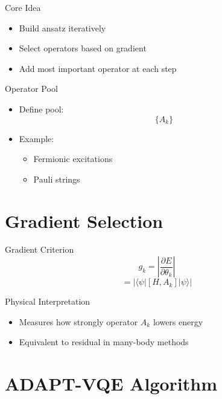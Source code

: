 \documentclass{beamer}
\begin{document}
\begin{frame}{Core Idea}
\begin{itemize}
\item Build ansatz iteratively
\item Select operators based on gradient
\item Add most important operator at each step
\end{itemize}
\end{frame}


\begin{frame}{Operator Pool}
\begin{itemize}
\item Define pool:
\[
\{A_k\}
\]
\item Example:
\begin{itemize}
\item Fermionic excitations
\item Pauli strings
\end{itemize}
\end{itemize}
\end{frame}

\section{Gradient Selection}

\begin{frame}{Gradient Criterion}
\[
g_k = \left| \frac{\partial E}{\partial \theta_k} \right|
\]
\[
= \left| \langle \psi | [H, A_k] | \psi \rangle \right|
\]
\end{frame}


\begin{frame}{Physical Interpretation}
\begin{itemize}
\item Measures how strongly operator $A_k$ lowers energy
\item Equivalent to residual in many-body methods
\end{itemize}
\end{frame}

\section{ADAPT-VQE Algorithm}
\end{document}
